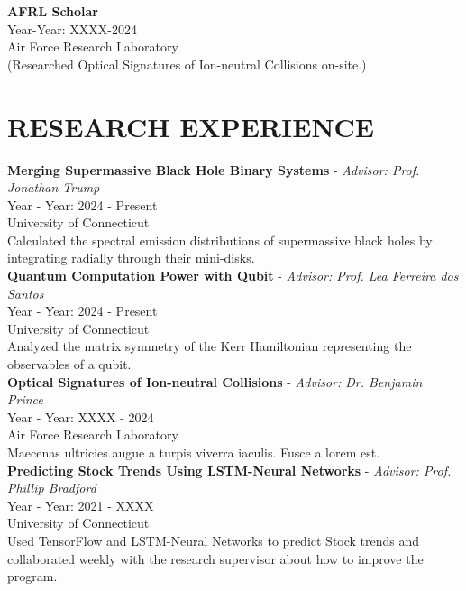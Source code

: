 \documentclass[a4paper,9pt]{extarticle}
\begin{document}
\noindent
\textbf{AFRL Scholar} \\
Year-Year: XXXX-2024 \\
Air Force Research Laboratory \\ 
(Researched Optical Signatures of Ion-neutral Collisions on-site.) 


\section*{RESEARCH EXPERIENCE}

\noindent
\newline
\textbf{Merging Supermassive Black Hole Binary Systems} - \textit{Advisor: Prof. Jonathan Trump} \\
Year - Year: 2024 - Present \\
University of Connecticut\\
Calculated the spectral emission distributions of supermassive black holes by integrating radially through their
mini-disks. \\

\noindent
\textbf{Quantum Computation Power with Qubit} - \textit{Advisor: Prof. Lea Ferreira dos Santos} \\
Year - Year: 2024 - Present \\
University of Connecticut\\
Analyzed the matrix symmetry of the Kerr Hamiltonian representing the observables of a qubit. \\

\noindent
\textbf{Optical Signatures of Ion-neutral Collisions} - \textit{Advisor: Dr. Benjamin Prince} \\
Year - Year: XXXX - 2024 \\
Air Force Research Laboratory\\
Maecenas ultricies augue a turpis viverra iaculis. Fusce a lorem est. \\

\noindent
\textbf{Predicting Stock Trends Using LSTM-Neural Networks} - \textit{Advisor: Prof. Phillip Bradford} \\
Year - Year: 2021 - XXXX \\
University of Connecticut\\
Used TensorFlow and LSTM-Neural Networks to predict Stock trends and collaborated weekly with the research supervisor about how to improve the program. \\
\end{document}
